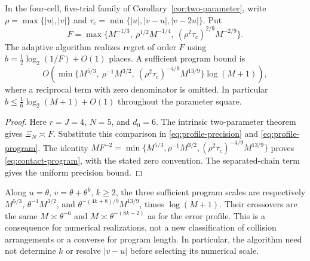 \begin{corollary}
\label{cor:resource-phases}
In the four-cell, five-trial family of Corollary~\ref{cor:two-parameter},
write $\rho=\max\{|u|,|v|\}$ and
$\tau_c=\min\{|u|,|v-u|,|v-2u|\}$. Put
\[
 F=\max\{M^{-1/3},\ \rho^{1/2}M^{-1/4},\
                         (\rho^2\tau_c)^{2/9}M^{-2/9}\}.
\]
The adaptive algorithm realizes regret of order $F$ using
$b=\frac12\log_2(1/F)+O(1)$ places. A sufficient program bound is
\begin{equation}\label{eq:contact-program}
 O\!\left(\min\{M^{5/3},\ \rho^{-1}M^{3/2},\
                 (\rho^2\tau_c)^{-4/9}M^{13/9}\}\log(M+1)\right),
\end{equation}
where a reciprocal term with zero denominator is omitted. In particular
$b\le\frac16\log_2(M+1)+O(1)$ throughout the parameter square.
\end{corollary}
\begin{proof}
Here $r=J=4$, $N=5$, and $d_0=6$. The intrinsic two-parameter theorem
gives $\Xi_N\asymp F$. Substitute this comparison in
\eqref{eq:profile-precision} and \eqref{eq:profile-program}. The identity
$M F^{-2}=\min\{M^{5/3},\rho^{-1}M^{3/2},
(\rho^2\tau_c)^{-4/9}M^{13/9}\}$ proves
\eqref{eq:contact-program}, with the stated zero convention.
The separated-chain term gives the uniform precision bound.
\end{proof}

Along $u=\theta$, $v=\theta+\theta^k$, $k\ge2$, the three sufficient
program scales are respectively $M^{5/3}$,
$\theta^{-1}M^{3/2}$, and
$\theta^{-(4k+8)/9}M^{13/9}$, times $\log(M+1)$.
Their crossovers are the same $M\asymp\theta^{-6}$ and
$M\asymp\theta^{-(8k-2)}$ as for the error profile. This is a
consequence for numerical realizations, not a new classification of
collision arrangements or a converse for program length. In particular,
the algorithm need not determine $k$ or resolve $|v-u|$ before selecting
its numerical scale.
